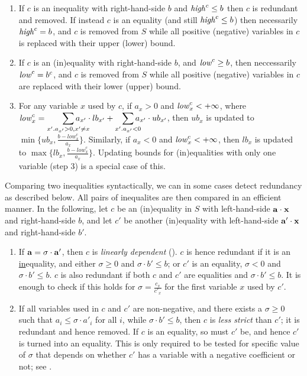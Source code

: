 \begin{enumerate} \itemsep0em
\setcounter{enumi}{\value{counterName}}
	\item If $c$ is an inequality with right-hand-side $b$ and $\mathit{high}^c \leq b$ then $c$ is redundant and removed. If instead $c$ is an equality (and still $\mathit{high}^c \leq b$) then necessarily $\mathit{high}^c = b$, and $c$ is removed from $S$ while all positive (negative) variables in $c$ is replaced with their upper (lower) bound.
	\item If $c$ is an (in)equality with right-hand-side $b$, and $\mathit{low}^c \geq b$, then neccessarily $\mathit{low}^c = b^c$, and $c$ is removed from $S$ while all positive (negative) variables in $c$ are replaced with their lower (upper) bound.
	\item For any variable $x$ used by $c$, if $a_x > 0$ and $\mathit{low}_x^c<+\infty$, 
	where $\mi{low}_x^c = \smashoperator[r]{\sum_{x'.a_{x'}>0, x'\neq x}}a_{x'}\cdot lb_{x'} + \smashoperator[r]{\sum_{x'.a_{x'}<0}}a_{x'}\cdot ub_{x'}$, 
	then $ub_x$ is updated to $\min\{ub_x, \frac{b-\mathit{low}_x^c}{a_x}\}$. 
	Similarly, if $a_x < 0$ and $\mathit{low}_x^c<+\infty$, then $lb_x$ is updated to $\max\{lb_x, \frac{b-\mathit{low}_x^c}{a_x}\}$.	
	Updating bounds for (in)equalities with only one variable (step 3) is a special case of this.
\setcounter{counterName}{\value{enumi}}
\end{enumerate}	
%
Comparing two inequalities syntactically, we can in some cases detect redundancy as described below. All pairs of inequalites are then compared in an efficient manner.
In the following, let $c$ be an (in)equality in $S$ with left-hand-side $\mathbf{a}\cdot \mathbf{x}$ and right-hand-side $b$, and let $c'$ be another (in)equality with left-hand-side $\mathbf{a}'\cdot \mathbf{x}$ and right-hand-side $b'$. 
\begin{enumerate} \itemsep0em
\setcounter{enumi}{\value{counterName}}
\item 
If $\mathbf{a}=\sigma\cdot \mathbf{a}'$, then $c$ is \emph{linearly dependent} (\cite{lassez93}). $c$ is hence redundant if
it is an \underline{in}equality, and either $\sigma\geq 0$ and $\sigma\cdot b'\leq b$; or $c'$ is an equality, $\sigma<0$ and $\sigma\cdot b'\leq b$. $c$ is also redundant if both $c$ and $c'$ are equalities and $\sigma\cdot b'\leq b$. 
It is enough to check if this holds for $\sigma = \frac{c_x}{c'_x}$ for the first variable $x$ used by $c'$.
\item
If all variables used in $c$ and $c'$ are non-negative, and there exists a $\sigma\geq 0$ such that $a_i \leq \sigma \cdot a'_i$ for all $i$, while $\sigma\cdot b' \leq b$, then $c$ is \emph{less strict} than $c'$; it is redundant and hence removed. If $c$ is an equality, so must $c'$ be, and hence $c'$ is turned into an equality. 
This is only required to be tested for specific value of $\sigma$ that depends on whether $c'$ has a variable with a negative coefficient or not; see \cite{MyTechRep}.
\end{enumerate} 
